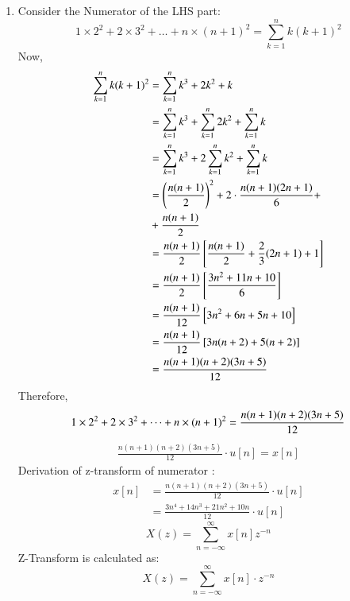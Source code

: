\documentclass[journal,12pt,twocolumn]{IEEEtran}
\theoremstyle{remark}
\begin{document}
\begin{enumerate}[label=\alph*)]
\item Consider the Numerator of the LHS part:
\begin{equation}
    1\times2^2 + 2\times3^2 + \dots + n\times(n+1)^2 = \sum_{k=1}^n k(k+1)^2 
\end{equation}
Now,
\begin{align}
    \sum_{k=1}^n k(k+1)^2 &= \sum_{k=1}^n k^3+2k^2+k\\
                          &=  \sum_{k=1}^n k^3 + \sum_{k=1}^n 2k^2 + \sum_{k=1}^n k\\
                          &=  \sum_{k=1}^n k^3 + 2\sum_{k=1}^n k^2 + \sum_{k=1}^n k\\
                          &= \left(\frac{n(n+1)}{2}\right)^{\scriptstyle 2} + 2\cdot \frac{n(n+1)(2n+1)}{6}+\\  &+\frac{n(n+1)}{2}\notag \\
                          &= \frac{n(n+1)}{2}\left[\frac{n(n+1)}{2} + \frac{2}{3}(2n+1) + 1\right]\\
                          &= \frac{n(n+1)}{2}\left[\frac{3n^2 + 11n +10}{6}\right]\\
                          &= \frac{n(n+1)}{12}\left[3n^2 + 6n + 5n + 10\right]\\
                          &= \frac{n(n+1)}{12}\left[3n(n+2)+5(n+2)\right]\\
                          &= \frac{n(n+1)(n+2)(3n+5)}{12}
\end{align}
Therefore,
\begin{equation}
   1\times2^2 + 2\times3^2 + \dots + n\times(n+1)^2 = \frac{n(n+1)(n+2)(3n+5)}{12}   \\
\end{equation}
\begin{align}
    \frac{n(n+1)(n+2)(3n+5)}{12}\cdot u[n] = x[n]
\end{align}
Derivation of z-transform of numerator :
\begin{align}
    x[n] &= \frac{n(n+1)(n+2)(3n+5)}{12}\cdot u[n]\\
         &= \frac{3n^4 + 14n^3 + 21n^2 + 10n}{12}\cdot u[n]\
\end{align}
\begin{equation}
    X(z) = \sum_{n=-\infty}^\infty x[n]z^{-n}
\end{equation}
Z-Transform is calculated as:
\begin{equation}
    X(z) = \sum_{n=-\infty}^\infty x[n]\cdot z^{-n}
\end{equation}

\end{enumerate}
\end{document}
